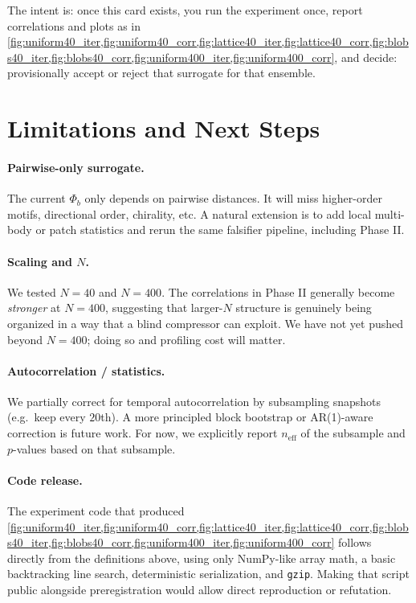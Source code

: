 \documentclass[11pt,a4paper]{article}
\numberwithin{equation}{section}
\newcommand{\phib}{\Phi_b}
\begin{document}
The intent is: once this card exists, you run the experiment once, report correlations and plots as in \cref{fig:uniform40_iter,fig:uniform40_corr,fig:lattice40_iter,fig:lattice40_corr,fig:blobs40_iter,fig:blobs40_corr,fig:uniform400_iter,fig:uniform400_corr}, and decide: provisionally accept or reject that surrogate for that ensemble.

\section{Limitations and Next Steps}
\paragraph{Pairwise-only surrogate.}
The current $\phib$ only depends on pairwise distances. It will miss higher-order motifs, directional order, chirality, etc. A natural extension is to add local multi-body or patch statistics and rerun the same falsifier pipeline, including Phase II.

\paragraph{Scaling and $N$.}
We tested $N{=}40$ and $N{=}400$. The correlations in Phase II generally become \emph{stronger} at $N{=}400$, suggesting that larger-$N$ structure is genuinely being organized in a way that a blind compressor can exploit. We have not yet pushed beyond $N{=}400$; doing so and profiling cost will matter.

\paragraph{Autocorrelation / statistics.}
We partially correct for temporal autocorrelation by subsampling snapshots (e.g.\ keep every $20$th). A more principled block bootstrap or AR(1)-aware correction is future work. For now, we explicitly report $n_{\text{eff}}$ of the subsample and $p$-values based on that subsample.

\paragraph{Code release.}
The experiment code that produced \cref{fig:uniform40_iter,fig:uniform40_corr,fig:lattice40_iter,fig:lattice40_corr,fig:blobs40_iter,fig:blobs40_corr,fig:uniform400_iter,fig:uniform400_corr} follows directly from the definitions above, using only NumPy-like array math, a basic backtracking line search, deterministic serialization, and \texttt{gzip}. Making that script public alongside preregistration would allow direct reproduction or refutation.
\end{document}
